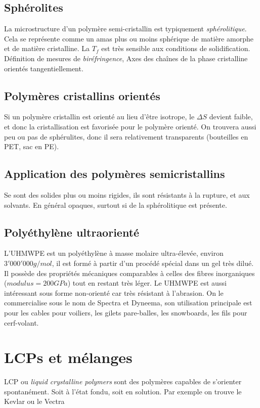\documentclass[../main.tex]{subfiles}
\begin{document}
	\subsection{Sphérolites}
	La microstructure d'un polymère semi-cristallin est typiquement \textit{sphérolitique}. Cela se représente comme un amas plus ou moins sphérique de matière amorphe et de matière cristalline. La $T_f$ est très sensible aux conditions de solidification. Définition de mesures de \textit{biréfringence}, Axes des chaînes de la phase cristalline orientés tangentiellement. 
	\subsection{Polymères cristallins orientés}
	Si un polymère cristallin est orienté au lieu d'être isotrope, le $\Delta S$ devient faible, et donc la cristallisation est favorisée pour le polymère orienté. On trouvera aussi peu ou pas de sphérulites, donc il sera relativement transparents (bouteilles en PET, sac en PE).
	\subsection{Application des polymères semicristallins}
	Se sont des solides plus ou moins rigides, ils sont résistants à la rupture, et aux solvants. En général opaques, surtout si de la sphérolitique est présente. 
	\subsection{Polyéthylène ultraorienté}
	L'UHMWPE est un polyéthylène à masse molaire ultra-élevée, environ $3'000'000g/mol$, il est formé à partir d'un procédé spécial dans un gel très dilué. Il possède des propriétés mécaniques comparables à celles des fibres inorganiques ($modulus = 200GPa$) tout en restant très léger. Le UHMWPE est aussi intéressant sous forme non-orienté car très résistant à l'abrasion. On le commercialise sous le nom de Spectra et Dyneema, son utilisation principale est pour les cables pour voiliers, les gilets pare-balles, les snowboards, les fils pour cerf-volant.
	
	\section{LCPs et mélanges}
	LCP ou \textit{liquid crystalline polymers} sont des polymères capables de s'orienter spontanément. Soit à l'état fondu, soit en solution. Par exemple on trouve le Kevlar ou le Vectra
\end{document}
